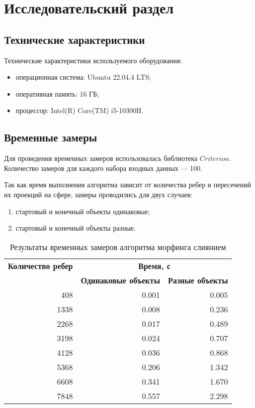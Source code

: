 \chapter{Исследовательский раздел}

\section{Технические характеристики}

Технические характеристики используемого оборудования:

\begin{itemize}[label=---]
	\item операционная система: Ubuntu 22.04.4 LTS;
	\item оперативная память: 16 ГБ;
	\item процессор: Intel(R) Core(TM) i5-10300H.
\end{itemize}

\section{Временные замеры}

Для проведения временных замеров использовалась библиотека $Criterion$. Количество замеров для каждого набора входных данных --- 100.

Так как время выполнения алгоритма зависит от количества ребер и пересечений их проекций на сфере, замеры проводились для двух случаев:
\begin{enumerate}[label={\arabic*)}]
	\item стартовый и конечный объекты одинаковые;
	\item стартовый и конечный объекты разные.
\end{enumerate}

\begin{table}[ht]
	\small
	\begin{center}
		\begin{threeparttable}
			\caption{Результаты временных замеров алгоритма морфинга слиянием}
			\label{tbl:res}
			\begin{tabular}{|r|r|r|}
				\hline
				\bfseries Количество ребер & \multicolumn{2}{c|}{\bfseries Время, с} \\
				\cline{2-3}
				& \bfseries Одинаковые объекты & \bfseries Разные объекты \\
				\hline
				408 & 0.001 & 0.005 \\
				\hline
				1338 & 0.008 & 0.236 \\
				\hline
				2268 & 0.017 & 0.489 \\
				\hline
				3198 & 0.024 & 0.707 \\
				\hline
				4128 & 0.036 & 0.868 \\
				\hline
				5368 & 0.206 & 1.342 \\
				\hline
				6608 & 0.341 & 1.670 \\
				\hline
				7848 & 0.557 & 2.298 \\
				\hline
			\end{tabular}
		\end{threeparttable}
	\end{center}
\end{table}


